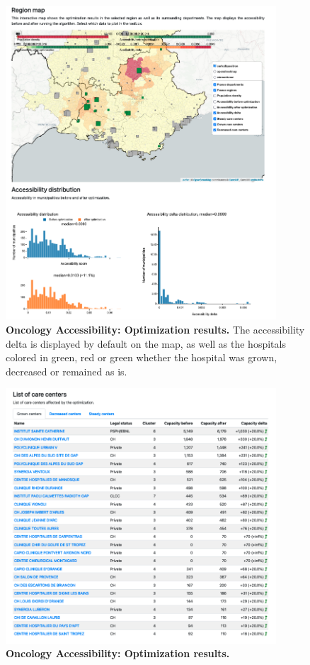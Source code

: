 \begin{figure}[H]
    \includegraphics[width=0.9\textwidth]{images/oncology-accessibility/optim-paca-map.png}
    \centering
    \caption{
        \textbf{Oncology Accessibility: Optimization results.}  The accessibility delta is displayed by default on the map, as well as the hospitals colored in green, red or green whether the hospital was grown, decreased or remained as is.
    }
    \label{fig:optim-results}
\end{figure}

\begin{figure}[H]
    \includegraphics[width=0.9\textwidth]{images/oncology-accessibility/optim-paca-grown-hospitals.png}
    \centering
    \caption{
        \textbf{Oncology Accessibility: Optimization results.}
    }
\end{figure}

